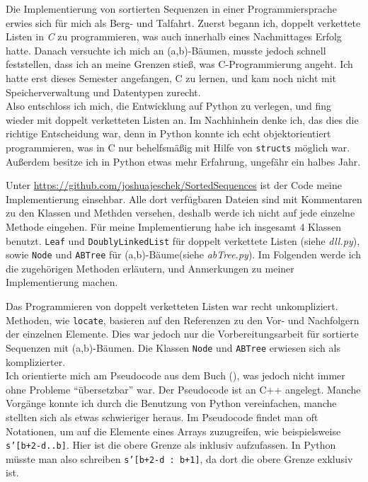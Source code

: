 Die Implementierung von sortierten Sequenzen in einer Programmiersprache erwies sich für mich als Berg- und Talfahrt. Zuerst begann ich, doppelt verkettete Listen in \textit{C} zu programmieren, was auch innerhalb eines Nachmittages Erfolg hatte. Danach versuchte ich mich an (a,b)-Bäumen, musste jedoch schnell feststellen, dass ich an meine Grenzen stieß, was C-Programmierung angeht. Ich hatte erst dieses Semester angefangen, C zu lernen, und kam noch nicht mit Speicherverwaltung und Datentypen zurecht.
\\
Also entschloss ich mich, die Entwicklung auf Python zu verlegen, und fing wieder mit doppelt verketteten Listen an. Im Nachhinhein denke ich, das dies die richtige Entscheidung war, denn in Python konnte ich echt objektorientiert programmieren, was in C nur behelfsmäßig mit Hilfe von \texttt{structs} möglich war. Außerdem besitze ich in Python etwas mehr Erfahrung, ungefähr ein halbes Jahr.
\par
Unter \url{https://github.com/joshuajeschek/SortedSequences} ist der Code meine Implementierung einsehbar. Alle dort verfügbaren Dateien sind mit Kommentaren zu den Klassen und Methden versehen, deshalb werde ich nicht auf jede einzelne Methode eingehen. Für meine Implementierung habe ich insgesamt 4 Klassen benutzt. \texttt{Leaf} und \texttt{DoublyLinkedList} für doppelt verkettete Listen (siehe \textit{dll.py}), sowie \texttt{Node} und \texttt{ABTree} für (a,b)-Bäume(siehe \textit{abTree.py}). Im Folgenden werde ich die zugehörigen Methoden erläutern, und Anmerkungen zu meiner Implementierung machen.
\par
Das Programmieren von doppelt verketteten Listen war recht unkompliziert. Methoden, wie \texttt{locate}, basieren auf den Referenzen zu den Vor- und Nachfolgern der einzelnen Elemente. Dies war jedoch nur die Vorbereitungsarbeit für sortierte Sequenzen mit (a,b)-Bäumen. Die Klassen \texttt{Node} und \texttt{ABTree} erwiesen sich als komplizierter.
\\
Ich orientierte mich am Pseudocode aus dem Buch (\cite{Sanders:19}), was jedoch nicht immer ohne Probleme "`übersetzbar"' war. Der Pseudocode ist an C++ angelegt. Manche Vorgänge konnte ich durch die Benutzung von Python vereinfachen, manche stellten sich als etwas schwieriger heraus. Im Pseudocode findet man oft Notationen, um auf die Elemente eines Arrays zuzugreifen, wie beispielsweise \texttt{s'[b+2-d..b]}. Hier ist die obere Grenze als inklusiv aufzufassen. In Python müsste man also schreiben \texttt{s'[b+2-d : b+1]}, da dort die obere Grenze exklusiv ist.
